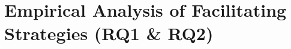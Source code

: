 \chapter{Empirical Analysis of Facilitating Strategies (RQ1 \& RQ2)}
\label{ch:empirical-analysis-of-facilitating-strategies}



